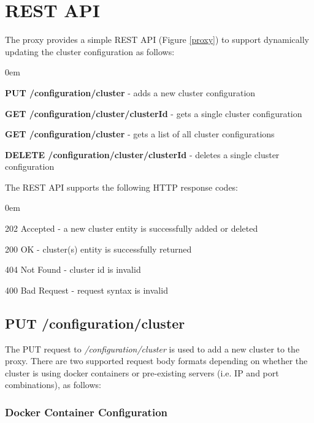 \documentclass[a4paper,11pt,twoside]{report}
\begin{document}
\section{REST API}
The proxy provides a simple REST API (Figure \ref{proxy}) to support dynamically updating the cluster configuration as follows:

\begin{list}{-}{}
  \itemsep0em
  \item\textbf{{PUT /configuration/cluster}} - adds a new cluster configuration
  
  \item\textbf{{GET /configuration/cluster/{clusterId}}} -  gets a single cluster configuration
  
   \item\textbf{{GET /configuration/cluster}} - gets a list of all cluster configurations
   
   \item\textbf{{DELETE /configuration/cluster/{clusterId}}} -  deletes a single cluster configuration
  
\end{list}
\noindent
The REST API supports the following HTTP response codes:

\begin{list}{-}{}
  \itemsep0em
  \item{202 Accepted}  -  a new cluster entity is successfully added or deleted
  
  \item{200 OK} -  cluster(s) entity is successfully returned
  
   \item{404 Not Found} - cluster id is invalid
   
    \item{400 Bad Request } - request syntax is invalid
  
\end{list}

\subsection{PUT /configuration/cluster}\label{PUT}
The PUT request to \textit{/configuration/cluster}  is used to add a new cluster to the proxy. There are two supported request body formats depending on whether the cluster is using docker containers or pre-existing servers (i.e. IP and port combinations), as follows:\bigskip

\subsubsection*{Docker Container Configuration}
\end{document}
